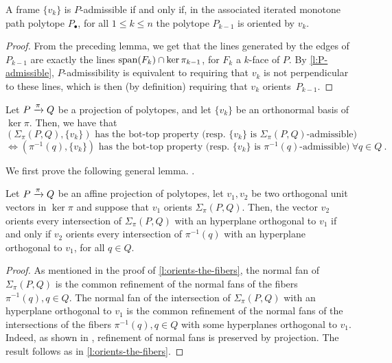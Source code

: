 \begin{lemma} \label{l:KV-BS}
	A frame $\{v_k\}$ is $P$-admissible if and only if, in the associated iterated monotone path polytope $P_\bullet$, for all $1 \leq k \leq n$ the polytope $P_{k-1}$ is oriented by $v_k$.
\end{lemma}

\begin{proof}
	From the preceding lemma, we get that the lines generated by the edges of $P_{k-1}$ are exactly the lines $\operatorname{\mathrm{span}}(F_k)\cap \ker \pi_{k-1}$, for $F_k$ a $k$-face of $P$.
	By \cref{l:P-admissible}, $P$-admissibility is equivalent to requiring that $v_k$ is not perpendicular to these lines, which is then (by definition) requiring that $v_k$ orients~$P_{k-1}$.
\end{proof}


\begin{theorem}	\label{t:bot-top-for-fibers}
	Let $P \xrightarrow{\pi} Q$ be a projection of polytopes, and let $\{v_k\}$ be an orthonormal basis of $\ker \pi$.
	Then, we have that
	\[
	(\Sigma_\pi(P,Q),\{v_k\}) \text{ has the bot-top property (resp. } \{v_k\} \text{ is }\Sigma_\pi(P,Q)\text{-admissible)}
	\]
	\[
	\iff (\pi^{-1}(q),\{v_k\}) \text{ has the bot-top property (resp. } \{v_k\} \text{ is }\pi^{-1}(q)\text{-admissible)} \ \forall q \in Q \ .
	\]
\end{theorem}

We first prove the following general lemma.
.

\begin{lemma} \label{l:iterated-orientation}
	Let $P\xrightarrow{\pi} Q$ be an affine projection of polytopes, let $v_1, v_2$ be two orthogonal unit vectors in $\ker \pi$ and suppose that $v_1$ orients $\Sigma_\pi (P,Q)$.
	Then, the vector $v_2$ orients every intersection of $\Sigma_\pi (P,Q)$ with an hyperplane orthogonal to $v_1$ if and only if $v_2$ orients every intersection of $\pi^{-1}(q)$ with an hyperplane orthogonal to $v_1$, for all $q \in Q$.
\end{lemma}

\begin{proof}
	As mentioned in the proof of \cref{l:orients-the-fibers}, the normal fan of $\Sigma_\pi(P,Q)$ is the common refinement of the normal fans of the fibers $\pi^{-1}(q), q \in Q$.
	The normal fan of the intersection of $\Sigma_\pi(P,Q)$ with an hyperplane orthogonal to $v_1$ is the common refinement of the normal fans of the intersections of the fibers $\pi^{-1}(q), q \in Q$ with some hyperplanes orthogonal to $v_1$.
	Indeed, as shown in \cite[Lemma 3.1]{BilleraSturmfels94}, refinement of normal fans is preserved by projection.
	The result follows as in \cref{l:orients-the-fibers}.
\end{proof}

